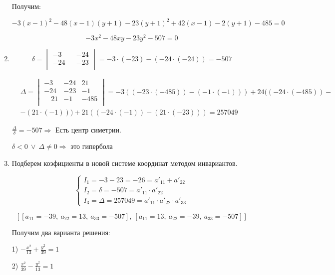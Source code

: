 \documentclass[a4paper, fontsize=14pt]{article} %
\begin{document}
\begin{enumerate}
        Получим:

        $$-3(x -1)^2 - 48(x - 1)(y + 1) - 23(y + 1)^2 + 42(x -1) - 2(y + 1)- 485 = 0$$

        $$ - 3 x^{2} - 48 x y - 23 y^{2} - 507 = 0$$
        
        \item 

       $$ \delta = \begin{vmatrix} -3 && -24\\ -24 && -23\\\end{vmatrix} = -3 \cdot (-23) - (-24 \cdot (-24)) = -507$$ 

       \begin{align*}
       & \Delta = 
       \begin{vmatrix}
            -3 & -24 & 21\\
            -24 & -23 & - 1\\
            \quad 21 & -1 & -485\\
       \end{vmatrix}
       = -3 ((-23 \cdot (- 485)) - (-1  \cdot (-1))) + 24 ((-24 \cdot (-485)) -\\
        & - (21 \cdot (-1))) + 21 ((-24 \cdot (-1)) - (21 \cdot (-23))) = 257049
       \end{align*}

       $\frac{\Delta}{\delta} = -507 \Longrightarrow$ Есть центр симетрии.

       $\delta < 0 \ \vee \ \Delta \neq 0 \Longrightarrow$ это гипербола

       \item Подберем коэфициенты в новой системе координат методом инвариантов.
       

    $$
    \begin{cases}
        I_1 = -3 -23 = -26 = a'_{11} + a'_{22}\\
        I_2 = \delta = -507 = a'_{11} \cdot a'_{22}\\
        I_3 = \Delta = 257049 = a'_{11} \cdot a'_{22} \cdot a'_{33}
    \end{cases} 
    $$

    $$
    [[a_{11} = -39, \  a_{22} = 13, \ a_{33} = -507], \ [a_{11} = 13, \  a_{22} = -39, \ a_{33} = -507]]
    $$

    Получим два варианта решения:

    1) $- \frac{x^{2}}{13} + \frac{y^{2}}{39} = 1$
    
    2) $\frac{x^{2}}{39} - \frac{y^{2}}{13} = 1$ \bigskip


\end{enumerate}
\end{document}
